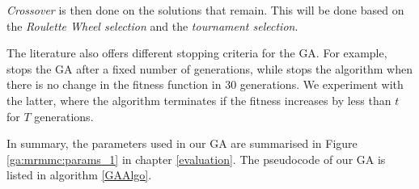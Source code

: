 \documentclass[12pt, twoside, a4paper]{report}
\begin{document}
\textit{Crossover} is then done on the solutions that remain. This will be done based on the \textit{Roulette Wheel selection} and the \textit{tournament selection}.


The literature also offers different stopping criteria for the GA. For example, \cite{RefWorks:202} stops the GA after a fixed number of generations, while \cite{RefWorks:212} stops the algorithm when there is no change in the fitness function in 30 generations. We experiment with the latter, where the algorithm terminates if the fitness increases by less than $t$ for $T$ generations.

In summary, the parameters used in our GA are summarised in Figure \ref{ga:mrmmc:params_1} in chapter \ref{evaluation}. The pseudocode of our GA is listed in algorithm \ref{GAAlgo}.
\end{document}
